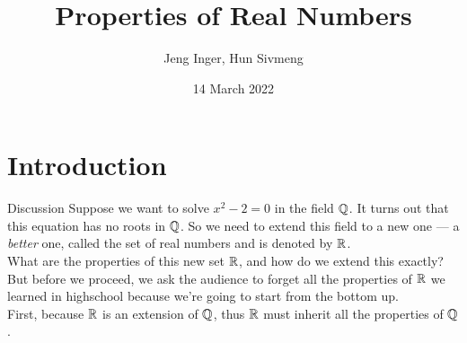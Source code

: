 \documentclass{beamer}
\title{Properties of Real Numbers}
\author{Jeng Inger, Hun Sivmeng}
\date{14 March 2022}
\begin{document}
\begin{frame}
  \maketitle
\end{frame}
\begin{frame}[b]
  \tableofcontents
\end{frame}
\section{Introduction}
\begin{frame}{Discussion}
  Suppose we want to solve $x^2-2=0$ in the field $\Q$.
  It turns out that this equation has no roots in $\Q$.
  So we need to extend this field to a new one --- 
  a \emph{better} one, called the set of real numbers and
  is denoted by $\R$.\\[0.3cm]
  What are the properties of this new set $\R$, and how
  do we extend this exactly? \\[0.3cm]
  But before we proceed, we ask the audience to forget
  all the properties of $\R$ we learned in highschool 
  because we're going to start from the bottom up.\\[0.3cm]
  First, because $\R$ is an extension of $\Q$, thus $\R$
  must inherit all the properties of $\Q$.
\end{frame}
\end{document}

